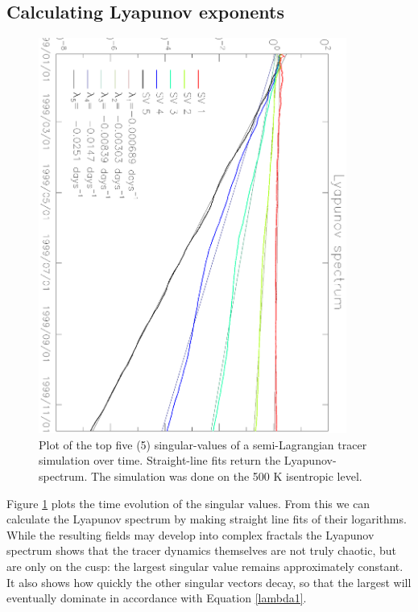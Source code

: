 \documentclass{article}
\begin{document}
\subsection{Calculating Lyapunov exponents}

\label{Lyapunov_exponents}

\begin{figure}
\begin{center}
\includegraphics[angle=90,width=0.9\textwidth]{../pc_proxy/lyap_spec.eps}
\caption{Plot of the top five (5) singular-values of a semi-Lagrangian
tracer simulation over time.  Straight-line fits return the Lyapunov-spectrum.
The simulation was done on the 500 K isentropic level.}
\label{lyap_spec}
\end{center}
\end{figure}

Figure \ref{lyap_spec} plots the time evolution of the singular values.
From this we can calculate the Lyapunov spectrum by making straight line
fits of their logarithms.
While the resulting fields may develop into complex fractals \citep{Mills2009}
the Lyapunov spectrum shows that the tracer dynamics themselves 
are not truly chaotic, but are
only on the cusp: the largest singular value remains approximately constant.
It also shows how quickly the other singular vectors decay,
so that the largest will eventually dominate in accordance with
Equation \ref{lambda1}.
\end{document}
